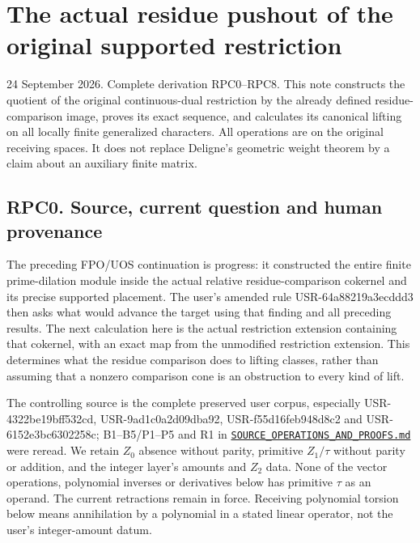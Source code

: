 \section{The actual residue pushout of the original supported
restriction}\label{the-actual-residue-pushout-of-the-original-supported-restriction}

24 September 2026. Complete derivation RPC0--RPC8. This note constructs
the quotient of the original continuous-dual restriction by the already
defined residue-comparison image, proves its exact sequence, and
calculates its canonical lifting on all locally finite generalized
characters. All operations are on the original receiving spaces. It does
not replace Deligne's geometric weight theorem by a claim about an
auxiliary finite matrix.

\subsection{RPC0. Source, current question and human
provenance}\label{rpc0.-source-current-question-and-human-provenance}

The preceding FPO/UOS continuation is progress: it constructed the
entire finite prime-dilation module inside the actual relative
residue-comparison cokernel and its precise supported placement. The
user's amended rule USR-64a88219a3ecddd3 then asks what would advance
the target using that finding and all preceding results. The next
calculation here is the actual restriction extension containing that
cokernel, with an exact map from the unmodified restriction extension.
This determines what the residue comparison does to lifting classes,
rather than assuming that a nonzero comparison cone is an obstruction to
every kind of lift.

The controlling source is the complete preserved user corpus, especially
USR-4322be19bff532cd, USR-9ad1c0a2d09dba92, USR-f55d16feb948d8c2 and
USR-6152e3bc6302258c; B1--B5/P1--P5 and R1 in
\href{../foundations/user_definitions_20260924/SOURCE_OPERATIONS_AND_PROOFS.md}{\nolinkurl{SOURCE_OPERATIONS_AND_PROOFS.md}}
were reread. We retain \(Z_0\) absence without parity, primitive
\(Z_1/\tau\) without parity or addition, and the integer layer's amounts
and \(Z_2\) data. None of the vector operations, polynomial inverses or
derivatives below has primitive \(\tau\) as an operand. The current
retractions remain in force. Receiving polynomial torsion below means
annihilation by a polynomial in a stated linear operator, not the user's
integer-amount datum.


